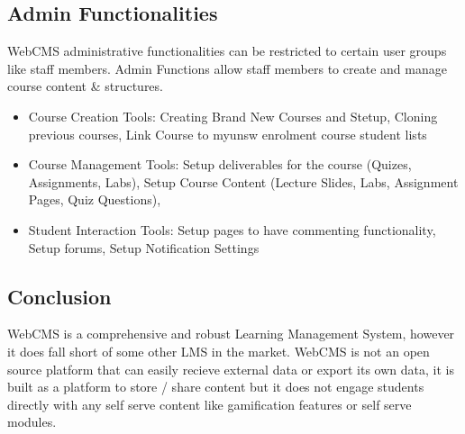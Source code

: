 \subsection{Admin Functionalities}
WebCMS administrative functionalities can be restricted to certain user groups like staff members. Admin Functions allow staff members to create and manage course content \& structures.

\begin{itemize}
	\item Course Creation Tools: Creating Brand New Courses and Stetup, Cloning previous courses, Link Course to myunsw enrolment course student lists
	\item Course Management Tools: Setup deliverables for the course (Quizes, Assignments, Labs), Setup Course Content (Lecture Slides, Labs, Assignment Pages, Quiz Questions), 
	\item Student Interaction Tools: Setup pages to have commenting functionality, Setup forums, Setup Notification Settings
\end{itemize}

\subsection{Conclusion}
WebCMS is a comprehensive and robust Learning Management System, however it does fall short of some other LMS in the market. WebCMS is not an open source platform that can easily recieve external data or export its own data, it is built as a platform to store / share content but it does not engage students directly with any self serve content like gamification features or self serve modules.
